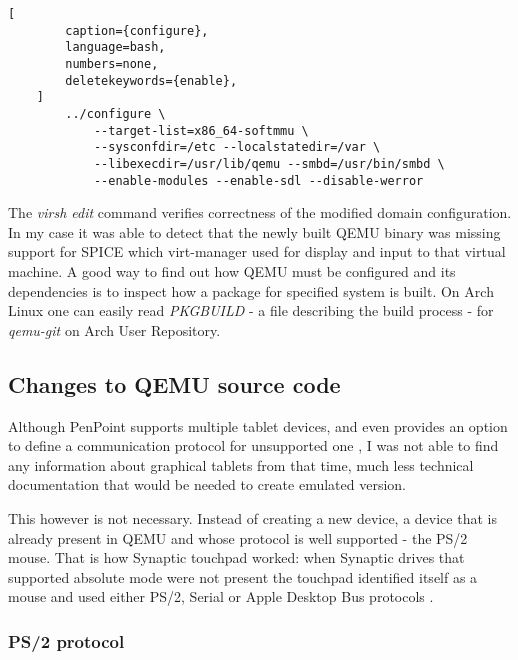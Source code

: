 \begin{codeblock}
    \begin{lstlisting}[
        caption={configure},
        language=bash,
        numbers=none,
        deletekeywords={enable},
    ]
        ../configure \
            --target-list=x86_64-softmmu \
            --sysconfdir=/etc --localstatedir=/var \
            --libexecdir=/usr/lib/qemu --smbd=/usr/bin/smbd \
            --enable-modules --enable-sdl --disable-werror
    \end{lstlisting}
\end{codeblock}

The \emph{virsh edit} command verifies correctness of the modified domain
configuration.  In my case it was able to detect that the newly built QEMU
binary was missing support for SPICE which virt-manager used for display and
input to that virtual machine.  A good way to find out how QEMU must be
configured and its dependencies is to inspect how a package for specified system
is built.  On Arch Linux one can easily read \emph{PKGBUILD} - a file describing
the build process - for \emph{qemu-git} on Arch User Repository.

\subsection{Changes to QEMU source code}


Although PenPoint supports multiple tablet devices, and even provides an option
to define a communication protocol for unsupported one \cite{godevtools}, I was
not able to find any information about graphical tablets from that time, much
less technical documentation that would be needed to create emulated version.

This however is not necessary.  Instead of creating a new device, a device that
is already present in QEMU and whose protocol is well supported - the PS/2
mouse.  That is how Synaptic touchpad worked: when Synaptic drives that
supported absolute mode were not present the touchpad identified itself as
a mouse and used either PS/2, Serial or Apple Desktop Bus protocols
\cite{synapticsinterfacing}.

\subsubsection{PS/2 protocol}

